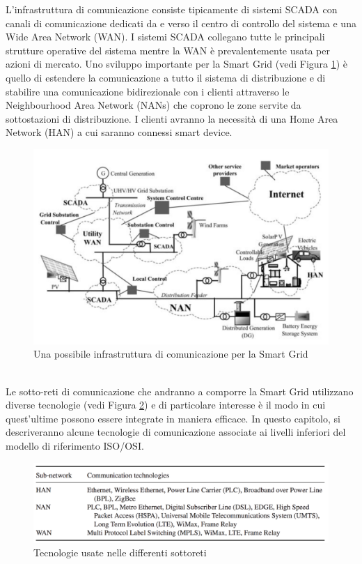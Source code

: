 L'infrastruttura di comunicazione consiste tipicamente di sistemi SCADA con canali di comunicazione dedicati da e verso il centro di controllo del sistema e una Wide Area Network (WAN). I sistemi SCADA collegano tutte le principali strutture operative del sistema mentre la WAN è prevalentemente usata per azioni di mercato. Uno sviluppo importante per la Smart Grid (vedi Figura \ref{fig:cisg}) è quello di estendere la comunicazione a tutto il sistema di distribuzione e di stabilire una comunicazione bidirezionale con i clienti attraverso le Neighbourhood Area Network (NANs) che coprono le zone servite da sottostazioni di distribuzione. I clienti avranno la necessità di una Home Area Network (HAN) a cui saranno connessi smart device.
\begin{figure}[h]
	\centering
	\includegraphics[scale=0.300]{imgs/comm_inf_SG.png}
	\caption{Una possibile infrastruttura di comunicazione per la Smart Grid} \label{fig:cisg}
\end{figure}\\
Le sotto-reti di comunicazione che andranno a comporre la Smart Grid utilizzano diverse tecnologie (vedi Figura \ref{fig:th}) e di particolare interesse è il modo in cui quest'ultime possono essere integrate in maniera efficace. 
In questo capitolo, si descriveranno alcune tecnologie di comunicazione associate ai livelli inferiori del modello di riferimento ISO/OSI.
\begin{figure}[h]
	\centering
	\includegraphics[scale=0.350]{imgs/tech.png}
	\caption{Tecnologie usate nelle differenti sottoreti} \label{fig:th}
\end{figure}

